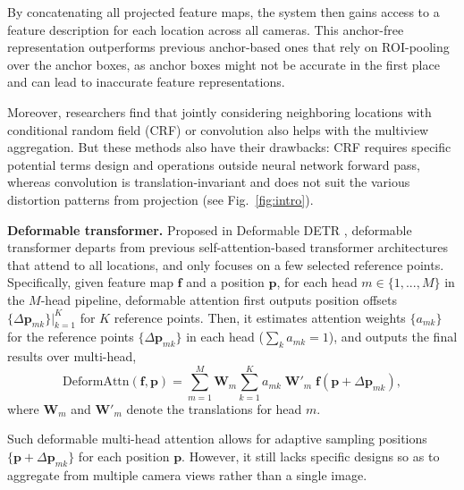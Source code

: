 \documentclass[sigconf,authorversion,nonacm]{acmart}
\begin{document}
By concatenating all projected feature maps, the system then gains access to a feature description for each location across all cameras. This anchor-free representation outperforms previous anchor-based ones \cite{baque2017deep,chavdarova2017deep} that rely on ROI-pooling \cite{ren2015faster} over the anchor boxes, as anchor boxes might not be accurate in the first place and can lead to inaccurate feature representations. 


Moreover, researchers find that jointly considering neighboring locations with conditional random field (CRF) \cite{baque2017deep} or convolution \cite{hou2020multiview} also helps with the multiview aggregation. But these methods also have their drawbacks: CRF requires specific potential terms design and operations outside neural network forward pass, whereas convolution is translation-invariant and does not suit the various distortion patterns from projection (see Fig.~\ref{fig:intro}). 

\textbf{Deformable transformer.} Proposed in Deformable DETR \cite{zhu2021deformable}, deformable transformer departs from previous self-attention-based transformer architectures \cite{vaswani2017attention} that attend to all locations, and only focuses on a few selected reference points. Specifically, given feature map $\bm{f}$ and a position $\bm{p}$, for each head $m\in\{1,...,M\}$ in the $M$-head pipeline, deformable attention first outputs position offsets $\{\Delta \bm{p}_{mk}\}\big\rvert_{k=1}^K$ for $K$ reference points. Then, it estimates attention weights $\{a_{mk}\}$ for the reference points $\{\Delta \bm{p}_{mk}\}$ in each head ($\sum_{k}{a_{mk}}=1$), and outputs the final results over multi-head,
\begin{equation}
\label{eq:attn}
    \text{DeformAttn}(\bm{f},\bm{p}) = \sum_{m=1}^{M} \bm{W}_m \sum_{k=1}^{K}{a_{mk} \; \bm{W}'_m \; \bm{f}(\bm{p}+\Delta \bm{p}_{mk})},
\end{equation}
where $\bm{W}_m$ and $\bm{W}'_m$ denote the translations for head $m$. 

Such deformable multi-head attention allows for adaptive sampling positions $\{\bm{p}+\Delta \bm{p}_{mk}\}$ for each position $\bm{p}$.
However, it still lacks specific designs so as to aggregate from multiple camera views rather than a single image. 
\end{document}
